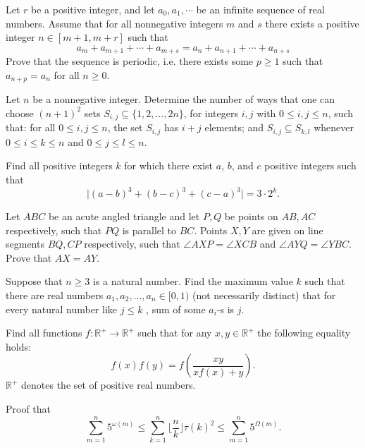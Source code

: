 \documentclass[11pt]{scrartcl}
\begin{document}
\begin{problem}[141708904596471]
Let $r$ be a positive integer, and let $a_0 , a_1 , \cdots $ be an infinite sequence of real numbers. Assume that for all nonnegative integers $m$ and $s$ there exists a positive integer $n \in [m+1, m+r]$ such that
\[ a_m + a_{m+1} +\cdots +a_{m+s} = a_n + a_{n+1} +\cdots +a_{n+s} \]
Prove that the sequence is periodic, i.e. there exists some $p \ge 1 $ such that $a_{n+p} =a_n $ for all $n \ge 0$.
\end{problem}
\begin{problem}[141955509989127]
Let $n$ be a nonnegative integer. Determine the number of ways that one can choose $(n+1)^2$ sets $S_{i,j}\subseteq\{1,2,\ldots,2n\}$, for integers $i,j$ with $0\leq i,j\leq n$, such that:
for all $0\leq i,j\leq n$, the set $S_{i,j}$ has $i+j$ elements; and
$S_{i,j}\subseteq S_{k,l}$ whenever $0\leq i\leq k\leq n$ and $0\leq j\leq l\leq n$.
\end{problem}
\begin{problem}[143039642317874]
Find all positive integers $k$ for which there exist $a$, $b$, and $c$ positive integers such that\[\lvert (a-b)^3+(b-c)^3+(c-a)^3\rvert=3\cdot2^k.\]
\end{problem}
\begin{problem}[143601603071770]
	Let $ABC$ be an acute angled triangle and let $P, Q$ be points on $AB, AC$ respectively, such that $PQ$ is parallel to $BC$. Points $X, Y$ are given on line segments $BQ, CP$ respectively, such that $\angle AXP = \angle XCB$ and $\angle AYQ = \angle YBC$. Prove that $AX = AY$.

\end{problem}
\begin{problem}[147296738719179]
	Suppose that $n\ge3$ is a natural number. Find the maximum value $k$ such that there are real numbers $a_1,a_2,...,a_n \in [0,1)$ (not necessarily distinct) that for every natural number like $j \le k$ , sum of some $a_i$-s is $j$.
\end{problem}
\begin{problem}[150193222906212]
Find all functions $ f: \mathbb {R} ^ + \to \mathbb {R} ^ + $ such that for any $ x, y \in \mathbb {R} ^ + $ the following equality holds:\[f (x) f (y) = f \left (\frac {xy} {x f (x) + y} \right). \]$ \mathbb {R} ^ + $ denotes the set of positive real numbers.
\end{problem}
\begin{problem}[154968452395640]
Proof that
$$ \sum_{m=1}^n5^{\omega (m)} \le \sum_{k=1}^n\lfloor \frac{n}{k} \rfloor \tau (k)^2  \le \sum_{m=1}^n5^{\Omega (m)} .$$
\end{problem}
\end{document}
